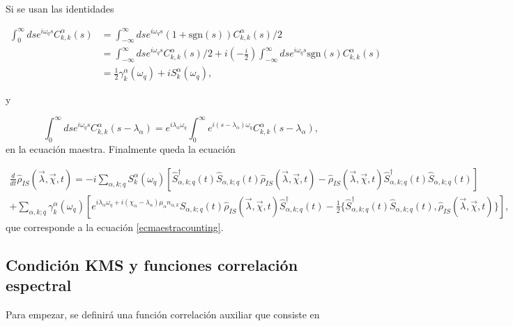 \begin{appendixs}
Si se usan las identidades

\begin{align*}
    \int_{0}^{\infty}ds e^{i\omega_{q}s}C^{\alpha}_{k,k}(s) & = \int_{-\infty}^{\infty}ds e^{i\omega_{q}s}(1+\text{sgn}(s))C^{\alpha}_{k,k}(s)/2 \\
    & = \int_{-\infty}^{\infty}ds e^{i\omega_{q}s}C^{\alpha}_{k,k}(s)/2 + i \left(-\frac{i}{2} \right) \int_{-\infty}^{\infty}ds e^{i\omega_{q}s} \text{sgn}(s)C^{\alpha}_{k,k}(s) \\
    & = \frac{1}{2}\gamma_{k}^{\alpha}(\omega_{q}) + i S^{\alpha}_{k}(\omega_{q}),
\end{align*}

y 

\begin{equation*}
    \int_{0}^{\infty}dse^{i\omega_{q}s}C^{\alpha}_{k,k}(s-\lambda_{\alpha}) = e^{i\lambda_{\alpha}\omega_{q}}\int_{0}^{\infty}e^{i(s-\lambda_{\alpha})\omega_{q}}C^{\alpha}_{k,k}(s-\lambda_{\alpha}), 
\end{equation*}
en la ecuación maestra. Finalmente queda la ecuación 

\begin{multline*}
    \frac{d}{dt}\hat{\rho}_{IS}(\vec{\lambda},\vec{\chi},t) = - i \sum_{\alpha,k;q}S^{\alpha}_{k}(\omega_{q})\left[\hat{S}^{\dagger}_{\alpha,k;q}(t)\hat{S}_{\alpha,k;q}(t)\hat{\rho}_{IS}(\vec{\lambda},\vec{\chi},t) - \hat{\rho}_{IS}(\vec{\lambda},\vec{\chi},t)\hat{S}^{\dagger}_{\alpha,k;q}(t)\hat{S}_{\alpha,k;q}(t) \right] \\
    + \sum_{\alpha,k;q} \gamma_{k}^{\alpha}(\omega_{q})\left[ e^{i\lambda_{\alpha}\omega_{q}+ i(\chi_{\alpha} - \lambda_{\alpha})\mu_{\alpha}n_{\alpha,k}}\hat{S}_{\alpha,k;q}(t)\hat{\rho}_{IS}(\vec{\lambda},\vec{\chi},t)\hat{S}^{\dagger}_{\alpha,k;q}(t) - \frac{1}{2}\{\hat{S}^{\dagger}_{\alpha,k;q}(t)\hat{S}_{\alpha,k;q}(t),\hat{\rho}_{IS}(\vec{\lambda},\vec{\chi},t) \} \right],
\end{multline*}
que corresponde a la ecuación \ref{ecmaestracounting}.

\label{apendixGKLSgeneral}

\newpage


\subsection{Condición KMS y funciones correlación espectral}
Para empezar, se definirá una función correlación auxiliar que consiste en 


\end{appendixs}

